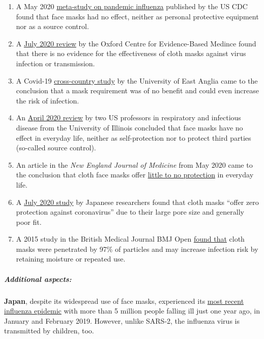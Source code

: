 \begin{enumerate}
\def\labelenumi{\arabic{enumi}.}
\tightlist
\item
  A May 2020
  \href{https://wwwnc.cdc.gov/eid/article/26/5/19-0994_article}{meta-study
  on pandemic influenza} published by the US CDC found that face masks
  had no effect, neither as personal protective equipment nor as a
  source control.
\item
  A
  \href{https://www.cebm.net/covid-19/masking-lack-of-evidence-with-politics/}{July
  2020 review} by the Oxford Centre for Evidence-Based Medince found
  that there is no evidence for the effectiveness of cloth masks against
  virus infection or transmission.
\item
  A Covid-19
  \href{https://www.uea.ac.uk/about/-/new-study-reveals-blueprint-for-getting-out-of-covid-19-lockdown}{cross-country
  study} by the University of East Anglia came to the conclusion that a
  mask requirement was of no benefit and could even increase the risk of
  infection.
\item
  An
  \href{https://www.cidrap.umn.edu/news-perspective/2020/04/commentary-masks-all-covid-19-not-based-sound-data}{April
  2020 review} by two US professors in respiratory and infectious
  disease from the University of Illinois concluded that face masks have
  no effect in everyday life, neither as self-protection nor to protect
  third parties (so-called source control).
\item
  An article in the \emph{New England Journal of Medicine} from May 2020
  came to the conclusion that cloth face masks offer
  \href{https://www.nejm.org/doi/full/10.1056/NEJMp2006372}{little to no
  protection} in everyday life.
\item
  A \href{http://www.asahi.com/ajw/articles/13523664}{July 2020 study}
  by Japanese researchers found that cloth masks ``offer zero protection
  against coronavirus'' due to their large pore size and generally poor
  fit.
\item
  A 2015 study in the British Medical Journal BMJ Open
  \href{https://bmjopen.bmj.com/content/5/4/e006577}{found that} cloth
  masks were penetrated by 97\% of particles and may increase infection
  risk by retaining moisture or repeated use.
\end{enumerate}

\hypertarget{additional-aspects}{%
\subparagraph{Additional aspects:}\label{additional-aspects}}

\textbf{Japan}, despite its widespread use of face masks, experienced
its
\href{https://www.upi.com/Top_News/World-News/2019/02/01/Millions-in-Japan-affected-as-flu-outbreak-grips-country/9191549043797/}{most
recent influenza epidemic} with more than 5 million people falling ill
just one year ago, in January and February 2019. However, unlike SARS-2,
the influenza virus is transmitted by children, too.

